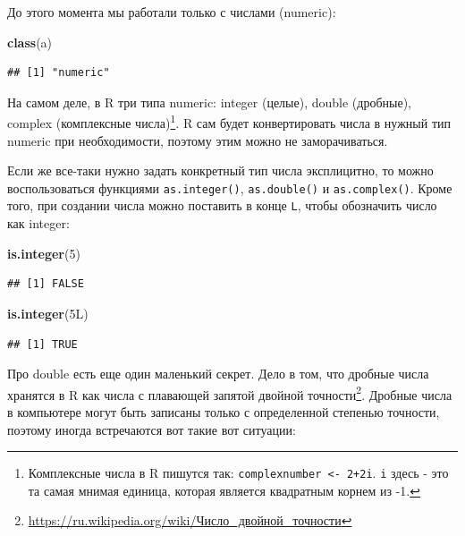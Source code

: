 \documentclass[
]{book}
\newenvironment{Shaded}{\begin{snugshade}}{\end{snugshade}}
\newcommand{\DecValTok}[1]{\textcolor[rgb]{0.00,0.00,0.81}{#1}}
\newcommand{\KeywordTok}[1]{\textcolor[rgb]{0.13,0.29,0.53}{\textbf{#1}}}
\newcommand{\NormalTok}[1]{#1}
\renewcommand{\href}[2]{#2\footnote{\url{#1}}}
\begin{document}
До этого момента мы работали только с числами (numeric):

\begin{Shaded}
\begin{Highlighting}[]
\KeywordTok{class}\NormalTok{(a)}
\end{Highlighting}
\end{Shaded}

\begin{verbatim}
## [1] "numeric"
\end{verbatim}

На самом деле, в R три типа numeric: integer (целые), double (дробные), complex (комплексные числа)\footnote{Комплексные числа в R пишутся так: \texttt{complexnumber\ \textless{}-\ 2+2i}. \texttt{i} здесь - это та самая мнимая единица, которая является квадратным корнем из -1.}. R сам будет конвертировать числа в нужный тип numeric при необходимости, поэтому этим можно не заморачиваться.

Если же все-таки нужно задать конкретный тип числа эксплицитно, то можно воспользоваться функциями \texttt{as.integer()}, \texttt{as.double()} и \texttt{as.complex()}. Кроме того, при создании числа можно поставить в конце \texttt{L}, чтобы обозначить число как integer:

\begin{Shaded}
\begin{Highlighting}[]
\KeywordTok{is.integer}\NormalTok{(}\DecValTok{5}\NormalTok{)}
\end{Highlighting}
\end{Shaded}

\begin{verbatim}
## [1] FALSE
\end{verbatim}

\begin{Shaded}
\begin{Highlighting}[]
\KeywordTok{is.integer}\NormalTok{(5L)}
\end{Highlighting}
\end{Shaded}

\begin{verbatim}
## [1] TRUE
\end{verbatim}

Про double есть еще один маленький секрет. Дело в том, что дробные числа хранятся в R как \href{https://ru.wikipedia.org/wiki/Число_двойной_точности}{числа с плавающей запятой двойной точности}. Дробные числа в компьютере могут быть записаны только с определенной степенью точности, поэтому иногда встречаются вот такие вот ситуации:
\end{document}
